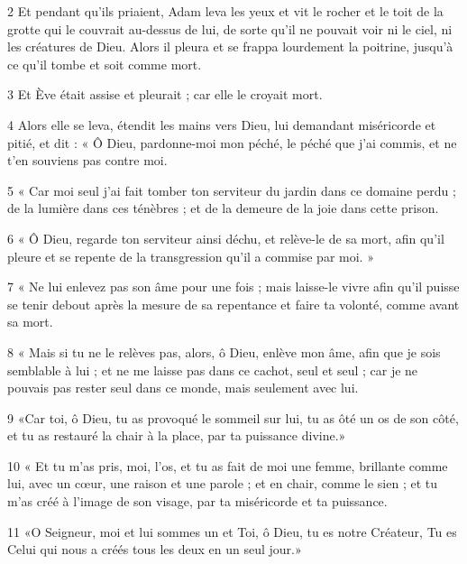 \par 2 Et pendant qu'ils priaient, Adam leva les yeux et vit le rocher et le toit de la grotte qui le couvrait au-dessus de lui, de sorte qu'il ne pouvait voir ni le ciel, ni les créatures de Dieu. Alors il pleura et se frappa lourdement la poitrine, jusqu'à ce qu'il tombe et soit comme mort.

\par 3 Et Ève était assise et pleurait ; car elle le croyait mort.

\par 4 Alors elle se leva, étendit les mains vers Dieu, lui demandant miséricorde et pitié, et dit : « Ô Dieu, pardonne-moi mon péché, le péché que j'ai commis, et ne t'en souviens pas contre moi.

\par 5 « Car moi seul j'ai fait tomber ton serviteur du jardin dans ce domaine perdu ; de la lumière dans ces ténèbres ; et de la demeure de la joie dans cette prison.

\par 6 « Ô Dieu, regarde ton serviteur ainsi déchu, et relève-le de sa mort, afin qu'il pleure et se repente de la transgression qu'il a commise par moi. »

\par 7 « Ne lui enlevez pas son âme pour une fois ; mais laisse-le vivre afin qu'il puisse se tenir debout après la mesure de sa repentance et faire ta volonté, comme avant sa mort.

\par 8 « Mais si tu ne le relèves pas, alors, ô Dieu, enlève mon âme, afin que je sois semblable à lui ; et ne me laisse pas dans ce cachot, seul et seul ; car je ne pouvais pas rester seul dans ce monde, mais seulement avec lui.

\par 9 «Car toi, ô Dieu, tu as provoqué le sommeil sur lui, tu as ôté un os de son côté, et tu as restauré la chair à la place, par ta puissance divine.»

\par 10 « Et tu m'as pris, moi, l'os, et tu as fait de moi une femme, brillante comme lui, avec un cœur, une raison et une parole ; et en chair, comme le sien ; et tu m'as créé à l'image de son visage, par ta miséricorde et ta puissance.

\par 11 «O Seigneur, moi et lui sommes un et Toi, ô Dieu, tu es notre Créateur, Tu es Celui qui nous a créés tous les deux en un seul jour.»


